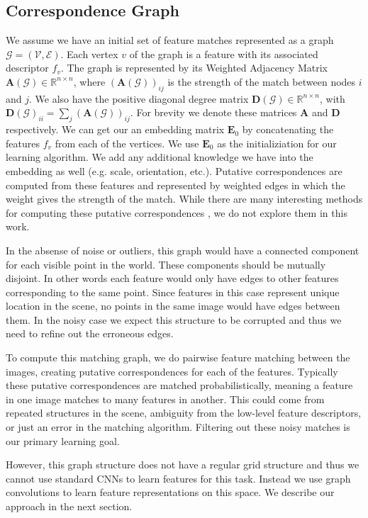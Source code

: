 \documentclass[10pt,twocolumn,letterpaper]{article}
\newcommand{\bR}{\mathbb{R}}
\newcommand{\mat}[1]{\mathbf{#1}}
\begin{document}
\subsection{Correspondence Graph}
We assume we have an initial set of feature matches represented as a graph $\mathcal{G} = (\mathcal{V}, \mathcal{E})$.
Each vertex $v$ of the graph is a feature with its associated descriptor $f_v$. 
The graph is represented by its Weighted Adjacency Matrix $\mat{A}(\mathcal{G}) \in \bR^{n \times n}$, where $(\mat{A}(\mathcal{G}))_{ij}$ is the strength of the match between nodes $i$ and $j$. We also have the positive diagonal degree matrix $\mat{D}(\mathcal{G}) \in \bR^{n \times n}$, with $\mat{D}(\mathcal{G})_{ii} = \sum_j (\mat{A}(\mathcal{G}))_{ij}$. For brevity we denote these matrices $\mat{A}$ and $\mat{D}$ respectively.
We can get our an embedding matrix $\mat{E}_0$ by concatenating the features $f_v$ from each of the vertices.
We use $\mat{E}_0$ as the initializiation for our learning algorithm.
We add any additional knowledge we have into the embedding as well (e.g. scale, orientation, etc.).
Putative correspondences are computed from these features and represented by weighted edges in which the weight gives the strength of the match.
While there are many interesting methods for computing these putative correspondences \cite{suh2015subgraph, yi2018learning}, we do not explore them in this work.

In the absense of noise or outliers, this graph would have a connected component for each visible point in the world.
These components should be mutually disjoint. 
In other words each feature would only have edges to other features corresponding to the same point.
Since features in this case represent unique location in the scene, no points in the same image would have edges between them.
In the noisy case we expect this structure to be corrupted and thus we need to refine out the erroneous edges.

To compute this matching graph, we do pairwise feature matching between the images, creating putative correspondences for each of the features.
Typically these putative correspondences are matched probabilistically, meaning a feature in one image matches to many features in another.
This could come from repeated structures in the scene, ambiguity from the low-level feature descriptors, or just an error in the matching algorithm.
Filtering out these noisy matches is our primary learning goal.

However, this graph structure does not have a regular grid structure and thus we cannot use standard CNNs to learn features for this task.
Instead we use graph convolutions to learn feature representations on this space.
We describe our approach in the next section.
\end{document}
